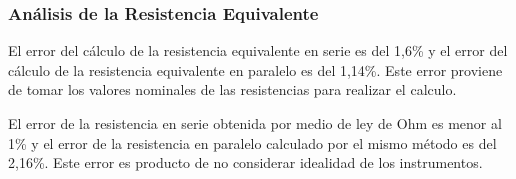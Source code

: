\subsubsection{Análisis de la Resistencia Equivalente}

    El error del  cálculo de la resistencia equivalente en serie es del 1,6\% y el error del cálculo de la resistencia equivalente en paralelo es del 1,14\%. Este error proviene de tomar los valores nominales de las resistencias para realizar el calculo. 

    El error de la resistencia en serie obtenida por medio de ley de Ohm es menor al 1\% y el error de la resistencia en paralelo calculado por el mismo método es del 2,16\%. Este error es producto de no considerar idealidad de los instrumentos.  
    
